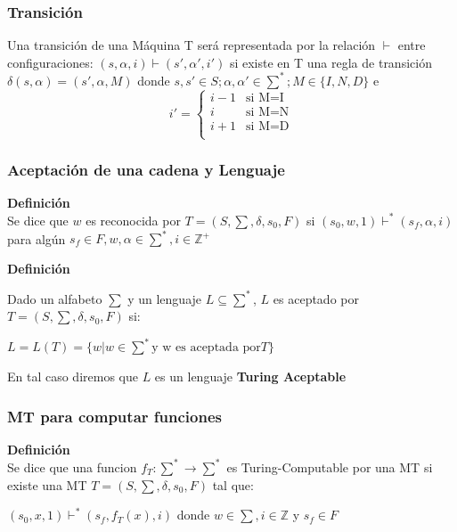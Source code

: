 \documentclass{beamer}                  %
\begin{document}
    \begin{frame}
        \frametitle{Transición}
        Una transición de una Máquina T será representada por la relación $\vdash$ entre configuraciones: 
        $(s,\alpha,i) \vdash (s',\alpha',i')$ si existe en T una regla de transición $\delta(s,\alpha) = (s',\alpha,M)$ donde $s,s' \in S; \alpha, \alpha' \in \sum^{*}; M \in \{I, N, D\}$ e
        \begin{equation}
            i' = 
            \begin{cases}
                i-1 & \text{si M=I} \\
                i & \text{si M=N}\\
                i+1 & \text{si M=D}\\
            \end{cases}
        \end{equation}
    \end{frame}
    \begin{frame}
        \frametitle{Aceptación de una cadena y Lenguaje}
        \textbf{Definición}\\

        Se dice que $w$ es reconocida por $T=(S,\sum,\delta,s_{0},F)$ si $(s_{0},w,1) \vdash^{*} (s_{f},\alpha,i)$ para algún $s_{f} \in F, w, \alpha \in \sum^{*}, i \in \mathbb{Z}^{+}$

        \bigskip

        \textbf{Definición}

        Dado un alfabeto $\sum$ y un lenguaje $L \subseteq \sum^{*}$, $L$ es aceptado por $T=(S,\sum,\delta,s_{0},F)$ si:

    $L = L(T) = \{w|w \in \sum^{*} \text{y w es aceptada por} T\}$

    En tal caso diremos que $L$ es un lenguaje \textbf{Turing Aceptable}

    \end{frame}
    \begin{frame}
        \frametitle{MT para computar funciones}
        \textbf{Definición}\\

        Se dice que una funcion $f_{T} : \sum^{*} \rightarrow \sum^{*}$ es Turing-Computable por una MT si existe una MT $T=(S,\sum,\delta,s_{0},F)$ tal que:

        $(s_{0},x,1) \vdash^{*} (s_{f},f_{T}(x),i)$ donde $w \in \sum, i \in \mathbb{Z}$ y $s_{f} \in F$
    \end{frame}
\end{document}
